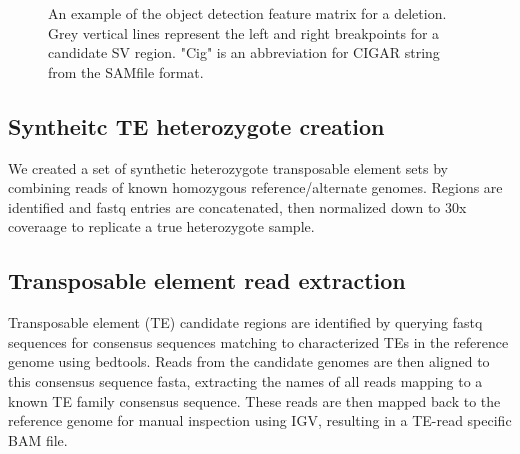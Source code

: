 \begin{figure}
    \centering
    \caption[Sample representations of the object detection feature matrix.]{An example of the object detection feature matrix for a deletion. Grey vertical lines represent the left and right breakpoints for a candidate SV region. "Cig" is an abbreviation for CIGAR string from the SAMfile format.}
    \label{fig:example_pileup}
\end{figure}

\subsection{Syntheitc TE heterozygote creation}
We created a set of synthetic heterozygote transposable element sets by combining reads of known homozygous reference/alternate genomes. Regions are identified and fastq entries are concatenated, then normalized down to 30x coveraage to replicate a true heterozygote sample. 

\subsection{Transposable element read extraction}

Transposable element (TE) candidate regions are identified by querying fastq sequences for consensus sequences matching to characterized TEs in the reference genome using bedtools. Reads from the candidate genomes are then aligned to this consensus sequence fasta, extracting the names of all reads mapping to a known TE family consensus sequence. These reads are then mapped back to the reference genome for manual inspection using IGV, resulting in a TE-read specific BAM file. 


